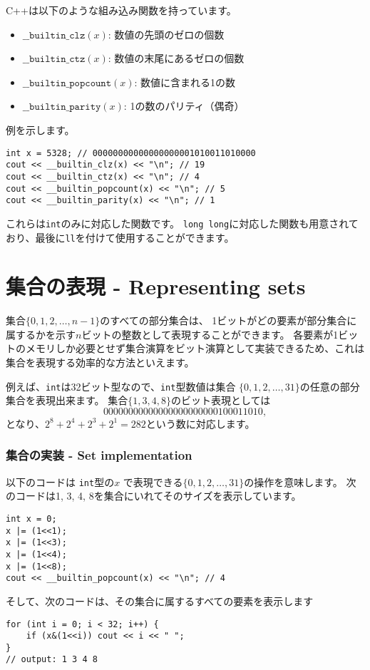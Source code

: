 C++は以下のような組み込み関数を持っています。
\begin{itemize}
\item
$\texttt{\_\_builtin\_clz}(x)$:
数値の先頭のゼロの個数
\item
$\texttt{\_\_builtin\_ctz}(x)$:
数値の末尾にあるゼロの個数
\item
$\texttt{\_\_builtin\_popcount}(x)$:
数値に含まれる1の数
\item
$\texttt{\_\_builtin\_parity}(x)$:
1の数のパリティ（偶奇） 
\end{itemize}
\begin{samepage}

例を示します。
\begin{lstlisting}
int x = 5328; // 00000000000000000001010011010000
cout << __builtin_clz(x) << "\n"; // 19
cout << __builtin_ctz(x) << "\n"; // 4
cout << __builtin_popcount(x) << "\n"; // 5
cout << __builtin_parity(x) << "\n"; // 1
\end{lstlisting}
\end{samepage}

これらは\texttt{int}のみに対応した関数です。
\texttt{long long}に対応した関数も用意されており、最後に\texttt{ll}を付けて使用することができます。

\section{集合の表現 - Representing sets}

集合$\{0,1,2,\ldots,n-1\}$のすべての部分集合は、
1ビットがどの要素が部分集合に属するかを示す$n$ビットの整数として表現することができます。
各要素が1ビットのメモリしか必要とせず集合演算をビット演算として実装できるため、これは集合を表現する効率的な方法といえます。

例えば、\texttt{int}は32ビット型なので、\texttt{int}型数値は集合
$\{0,1,2,\ldots,31\}$の任意の部分集合を表現出来ます。
集合$\{1,3,4,8\}$のビット表現としては
\[00000000000000000000000100011010,\]
となり、$2^8+2^4+2^3+2^1=282$という数に対応します。

\subsubsection{集合の実装 - Set implementation}

以下のコードは \texttt{int}型の$x$
で表現できる$\{0,1,2,\ldots,31\}$の操作を意味します。
次のコードは1, 3, 4, 8を集合にいれてそのサイズを表示しています。
\begin{lstlisting}
int x = 0;
x |= (1<<1);
x |= (1<<3);
x |= (1<<4);
x |= (1<<8);
cout << __builtin_popcount(x) << "\n"; // 4
\end{lstlisting}
そして、次のコードは、その集合に属するすべての要素を表示します
\begin{lstlisting}
for (int i = 0; i < 32; i++) {
    if (x&(1<<i)) cout << i << " ";
}
// output: 1 3 4 8
\end{lstlisting}

